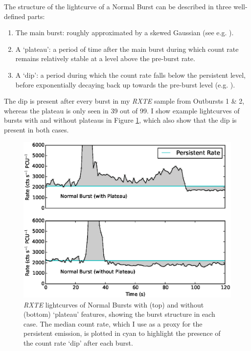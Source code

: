 \par The structure of the lightcurve of a Normal Burst can be described in three well-defined parts:

\begin{enumerate}
\item The main burst: roughly approximated by a skewed Gaussian (see e.g. \citealp{Azzalini_Dist}).
\item A `plateau': a period of time after the main burst during which count rate remains relatively stable at a level above the pre-burst rate.
\item A `dip': a period during which the count rate falls below the persistent level, before exponentially decaying back up towards the pre-burst level (e.g. \citealp{Younes_Expo}).
\end{enumerate}

\par The dip is present after every burst in my \textit{RXTE} sample from Outbursts 1 \& 2, whereas the plateau is only seen in 39 out of 99.  I show example lightcurves of bursts with and without plateaus in Figure \ref{fig:w_wo}, which also show that the dip is present in both cases.

\begin{figure}
  \centering
  \includegraphics[width=.9\linewidth, trim={0.8cm 0 1.6cm 0},clip]{images/w_woburst.eps}
  \caption[\textit{RXTE} lightcurves of Normal Bursts with (top) and without (bottom) `plateau' features, showing the burst structure in each case.]{\small \textit{RXTE} lightcurves of Normal Bursts with (top) and without (bottom) `plateau' features, showing the burst structure in each case.  The median count rate, which I use as a proxy for the persistent emission, is plotted in cyan to highlight the presence of the count rate `dip' after each burst.}
  \label{fig:w_wo}
\end{figure}

